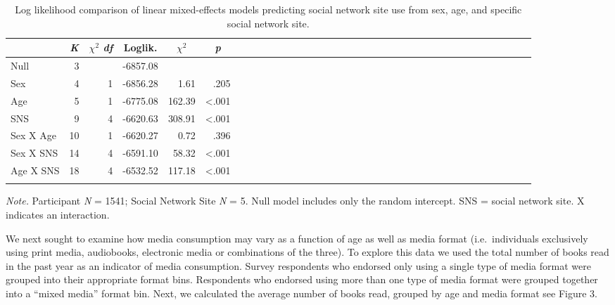 \documentclass[man]{apa6}
\theoremstyle{definition}
\theoremstyle{definition}
\theoremstyle{definition}
\theoremstyle{remark}
\begin{document}
\begin{table}[tbp]
\begin{center}
\begin{threeparttable}
\caption{\label{tab:df_lmer_table}Log likelihood comparison of linear mixed-effects models predicting social network site use from sex, age, and specific social network site.}
\begin{tabular}{lrrrrrlrrrrrlrrrrrlrrrrrlrrrrrlrrrrr}
\toprule
 & \multicolumn{1}{c}{\textit{K}} & \multicolumn{1}{c}{$\chi^2$ \textit{df}} & \multicolumn{1}{c}{Loglik.} & \multicolumn{1}{c}{$\chi^2$} & \multicolumn{1}{c}{\textit{p}}\\
\midrule
Null & 3 &  & -6857.08 &  & \\
Sex & 4 & 1 & -6856.28 & 1.61 & .205\\
Age & 5 & 1 & -6775.08 & 162.39 & <.001\\
SNS & 9 & 4 & -6620.63 & 308.91 & <.001\\
Sex X Age & 10 & 1 & -6620.27 & 0.72 & .396\\
Sex X SNS & 14 & 4 & -6591.10 & 58.32 & <.001\\
Age X SNS & 18 & 4 & -6532.52 & 117.18 & <.001\\
\bottomrule
\addlinespace
\end{tabular}
\begin{tablenotes}[para]
\normalsize{\textit{Note.} Participant \textit{N} = 1541; Social Network Site \textit{N} = 5. Null model includes only the random intercept. SNS = social network site. X indicates an interaction.}
\end{tablenotes}
\end{threeparttable}
\end{center}
\end{table}

We next sought to examine how media consumption may vary as a function
of age as well as media format (i.e.~individuals exclusively using print
media, audiobooks, electronic media or combinations of the three). To
explore this data we used the total number of books read in the past
year as an indicator of media consumption. Survey respondents who
endorsed only using a single type of media format were grouped into
their appropriate format bins. Respondents who endorsed using more than
one type of media format were grouped together into a \enquote{mixed
media} format bin. Next, we calculated the average number of books read,
grouped by age and media format see Figure 3.
\end{document}

